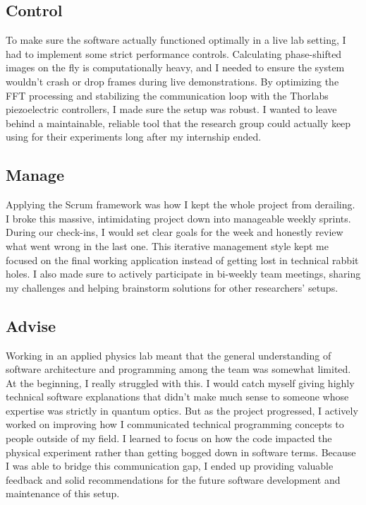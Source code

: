 \documentclass[12pt,a4paper]{article}
\begin{document}
\subsection{Control}
To make sure the software actually functioned optimally in a live lab setting, I had to implement some strict performance controls. Calculating phase-shifted images on the fly is computationally heavy, and I needed to ensure the system wouldn't crash or drop frames during live demonstrations. By optimizing the FFT processing and stabilizing the communication loop with the Thorlabs piezoelectric controllers, I made sure the setup was robust. I wanted to leave behind a maintainable, reliable tool that the research group could actually keep using for their experiments long after my internship ended.

\subsection{Manage}
Applying the Scrum framework was how I kept the whole project from derailing. I broke this massive, intimidating project down into manageable weekly sprints. During our check-ins, I would set clear goals for the week and honestly review what went wrong in the last one. This iterative management style kept me focused on the final working application instead of getting lost in technical rabbit holes. I also made sure to actively participate in bi-weekly team meetings, sharing my challenges and helping brainstorm solutions for other researchers' setups.

\subsection{Advise}
Working in an applied physics lab meant that the general understanding of software architecture and programming among the team was somewhat limited. At the beginning, I really struggled with this. I would catch myself giving highly technical software explanations that didn't make much sense to someone whose expertise was strictly in quantum optics. But as the project progressed, I actively worked on improving how I communicated technical programming concepts to people outside of my field. I learned to focus on how the code impacted the physical experiment rather than getting bogged down in software terms. Because I was able to bridge this communication gap, I ended up providing valuable feedback and solid recommendations for the future software development and maintenance of this setup.
\end{document}
